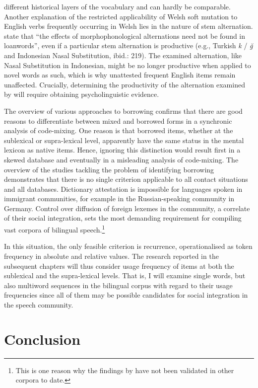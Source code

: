 different historical layers of the vocabulary and can hardly be comparable. Another explanation of the restricted applicability of Welsh soft mutation to English verbs frequently occurring in Welsh lies in the nature of stem alternation. \citet[][216]{haspelmath-sims} state that ``the effects of morphophonological alternations need not be found in loanwords'', even if a particular stem alternation is productive (e.g., Turkish \textit{k} / \textit{ğ} and Indonesian Nasal Substitution, ibid.: 219). The examined alternation, like Nasal Substitution in Indonesian, might be no longer productive when applied to novel words as such, which is why unattested frequent English items remain unaffected. Crucially, determining the productivity of the alternation examined by \citet{stammers-deuchar-2012} will require obtaining psycholinguistic evidence. 

The overview of various approaches to borrowing confirms that there are good reasons to differentiate between mixed and borrowed forms in a synchronic analysis of code-mixing. One reason is that borrowed items, whether at the sublexical or supra-lexical level, apparently have the same status in the mental lexicon as native items. Hence, ignoring this distinction would result first in a skewed database and eventually in a misleading analysis of code-mixing. The overview of the studies tackling the problem of identifying borrowing demonstrates that there is no single criterion applicable to all contact situations and all databases. Dictionary attestation is impossible for languages spoken in immigrant communities, for example in the Russian-speaking community in Germany. Control over diffusion of foreign lexemes in the community, a correlate of their social integration, sets the most demanding requirement for compiling vast corpora of bilingual speech.\footnote{
This is one reason why the findings by \citet{poplack-etal-1988} have not been validated in other corpora to date.}

In this situation, the only feasible criterion is recurrence, operationalised as token frequency in absolute and relative values. The research reported in the subsequent chapters will thus consider usage frequency of items at both the sublexical and the supra-lexical levels. That is, I will examine single words, but also multiword sequences in the bilingual corpus with regard to their usage frequencies since all of them may be possible candidates for social integration in the speech community.

\section{Conclusion}

